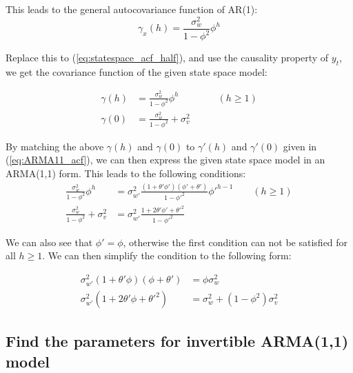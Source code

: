 This leads to the general autocovariance function of AR(1):
\begin{equation}
\gamma_x(h) = \frac{\sigma_w^2}{1-\phi^2} \phi^h
\end{equation}

Replace this to (\ref{eq:statespace_acf_half}), and use the causality property of $y_t$, we get the covariance function of the given state space model:

\begin{equation} \label{eq:statespace_acf}
\begin{split}
\gamma(h) &= \frac{\sigma_w^2}{1-\phi^2}\phi^h  \qquad \qquad (h \geq 1)\\
\gamma(0) &= \frac{\sigma_w^2}{1-\phi^2} + \sigma_v^2
\end{split}
\end{equation}

By matching the above $\gamma(h)$ and $\gamma(0)$ to $\gamma'(h)$ and $\gamma'(0)$ given in (\ref{eq:ARMA11_acf}), we can then express the given state space model in an ARMA(1,1) form. This leads to the following conditions:
\begin{equation}\label{eq:ARMA_11_conditions}
\begin{split}
\frac{\sigma_w^2}{1-\phi^2}\phi^h &= \sigma^2_{w'} \frac{(1+\theta'\phi')(\phi'+\theta')}{1-\phi'^2}\phi'^{h-1} \qquad (h \geq 1) \\
\frac{\sigma_w^2}{1-\phi^2} + \sigma_v^2 &= \sigma^2_{w'} \frac{1+2\theta'\phi'+\theta'^2}{1-\phi'^2} 
\end{split}
\end{equation}

We can also see that $\phi'= \phi$, otherwise the first condition can not be satisfied for all $h \geq 1$. We can then simplify the condition to the following form:

\begin{equation}\label{eq:ARMA_11_simp_conds}
\begin{split}
\sigma^2_{w'}(1+\theta'\phi)(\phi+\theta') &= \phi\sigma_w^2 \\
\sigma^2_{w'}(1+2\theta'\phi+\theta'^2) &= \sigma_w^2+ (1-\phi^2) \sigma_v^2
\end{split}
\end{equation}
\subsection{Find the parameters for invertible ARMA(1,1) model}

